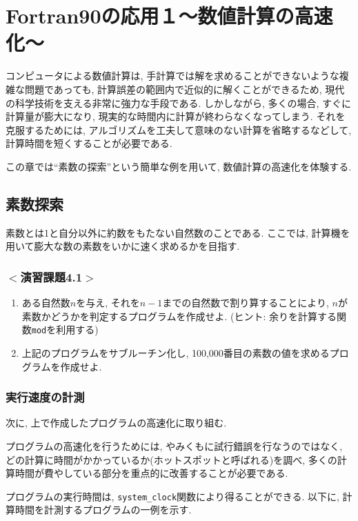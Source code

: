 \chapter{Fortran90の応用１〜数値計算の高速化〜}

コンピュータによる数値計算は, 手計算では解を求めることができないような複雑な問題であっても,
計算誤差の範囲内で近似的に解くことができるため, 現代の科学技術を支える非常に強力な手段である.
しかしながら, 多くの場合, すぐに計算量が膨大になり, 現実的な時間内に計算が終わらなくなってしまう. 
それを克服するためには, アルゴリズムを工夫して意味のない計算を省略するなどして,
計算時間を短くすることが必要である.

この章では``素数の探索''という簡単な例を用いて, 数値計算の高速化を体験する.


\section{素数探索}
素数とは1と自分以外に約数をもたない自然数のことである.
ここでは, 計算機を用いて膨大な数の素数をいかに速く求めるかを目指す.

\subsection*{$<$演習課題4.1$>$}
\begin{enumerate}
\item ある自然数$n$を与え, それを$n-1$までの自然数で割り算することにより,
$n$が素数かどうかを判定するプログラムを作成せよ.
(ヒント: 余りを計算する関数\verb|mod|を利用する)
\item 上記のプログラムをサブルーチン化し, 100,000番目の素数の値を求めるプログラムを作成せよ.
\end{enumerate}

\subsection{実行速度の計測}
次に, 上で作成したプログラムの高速化に取り組む.

プログラムの高速化を行うためには, やみくもに試行錯誤を行なうのではなく,
どの計算に時間がかかっているか(ホットスポットと呼ばれる)を調べ,
多くの計算時間が費やしている部分を重点的に改善することが必要である.

プログラムの実行時間は, \verb|system_clock|関数により得ることができる.
以下に, 計算時間を計測するプログラムの一例を示す.




